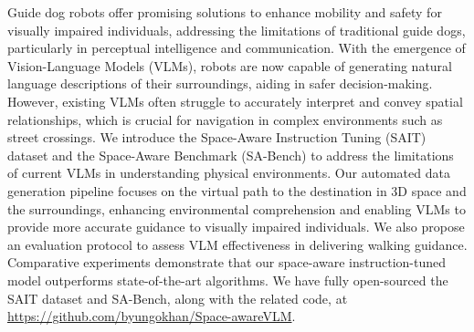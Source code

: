 Guide dog robots offer promising solutions to enhance mobility and safety for visually impaired individuals, addressing the limitations of traditional guide dogs, particularly in perceptual intelligence and communication. With the emergence of Vision-Language Models (VLMs), robots are now capable of generating natural language descriptions of their surroundings, aiding in safer decision-making. However, existing VLMs often struggle to accurately interpret and convey spatial relationships, which is crucial for navigation in complex environments such as street crossings. We introduce the Space-Aware Instruction Tuning (SAIT) dataset and the Space-Aware Benchmark (SA-Bench) to address the limitations of current VLMs in understanding physical environments. Our automated data generation pipeline focuses on the virtual path to the destination in 3D space and the surroundings, enhancing environmental comprehension and enabling VLMs to provide more accurate guidance to visually impaired individuals. We also propose an evaluation protocol to assess VLM effectiveness in delivering walking guidance. Comparative experiments demonstrate that our space-aware instruction-tuned model outperforms state-of-the-art algorithms. We have fully open-sourced the SAIT dataset and SA-Bench, along with the related code, at \href{https://github.com/byungokhan/Space-awareVLM}{https://github.com/byungokhan/Space-awareVLM}.